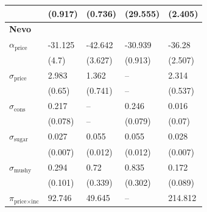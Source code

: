 \begin{tabular}{lllll}
                                                         & (0.917)          & (0.736)                                           & (29.555)                  & (2.405)           \\
 \midrule \textbf{Nevo} \\ \midrule $\alpha_{\text{price}}$  & -31.125          & -42.642                                           & -30.939                   & -36.28            \\
                                                         & (4.7)            & (3.627)                                           & (0.913)                   & (2.507)           \\
 $\sigma_{\text{price}}$                                 & 2.983            & 1.362                                             & --                        & 2.314             \\
                                                         & (0.65)           & (0.741)                                           & --                        & (0.537)           \\
 $\sigma_{\text{cons}}$                                  & 0.217            & --                                                & 0.246                     & 0.016             \\
                                                         & (0.078)          & --                                                & (0.079)                   & (0.07)            \\
 $\sigma_{\text{sugar}}$                                 & 0.027            & 0.055                                             & 0.055                     & 0.028             \\
                                                         & (0.007)          & (0.012)                                           & (0.012)                   & (0.007)           \\
 $\sigma_{\text{mushy}}$                                 & 0.294            & 0.72                                              & 0.835                     & 0.172             \\
                                                         & (0.101)          & (0.339)                                           & (0.302)                   & (0.089)           \\
 $\pi_{\text{price} \times \text{inc}}$                  & 92.746           & 49.645                                            & --                        & 214.812           \\

\end{tabular}
